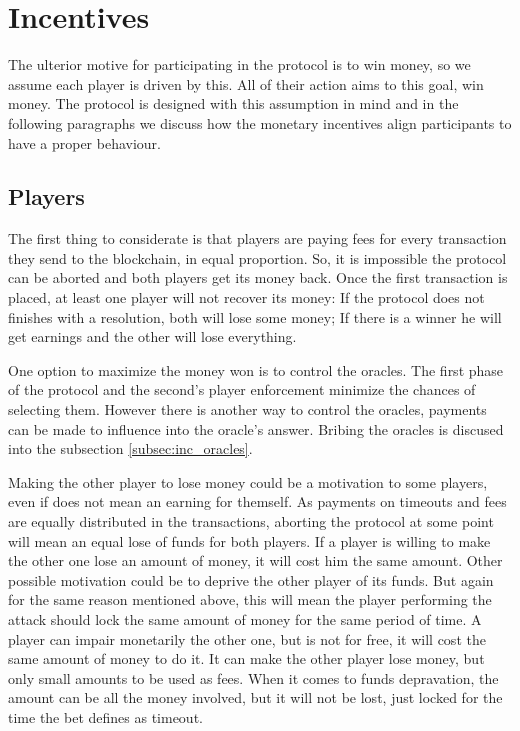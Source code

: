 \section{Incentives}

The ulterior motive for participating in the protocol is to win money, so we
  assume each player is driven by this.
All of their action aims to this goal, win money. The protocol is designed with
  this assumption in mind and in the following paragraphs we discuss how the
  monetary incentives align participants to have a proper behaviour.

\subsection{Players}
The first thing to considerate is that players are paying fees for every
  transaction they send to the blockchain, in equal proportion.
So, it is impossible the protocol can be aborted and both players get its
  money back.
Once the first transaction is placed, at least one player will not recover its
  money: If the protocol does not finishes with a resolution, both will lose
  some money; If there is a winner he will get earnings and the other will lose
  everything.

One option to maximize the money won is to control the oracles.
The first phase of the protocol and the second's player enforcement
  minimize the chances of selecting them.
However there is another way to control the oracles, payments can be made to
  influence into the oracle's answer.
Bribing the oracles is discused into the subsection \ref{subsec:inc_oracles}.

Making the other player to lose money could be a motivation to some players,
  even if does not mean an earning for themself.
As payments on timeouts and fees are equally distributed in the transactions,
  aborting the protocol at some point will mean an equal lose of funds for both
  players. If a player is willing to make the other one lose an amount of money,
  it will cost him the same amount.
Other possible motivation could be to deprive the other player of its funds.
But again for the same reason mentioned above, this will mean the player
  performing the attack should lock the same amount of money for the same period
  of time.
A player can impair monetarily the other one, but is not for free, it will cost
  the same amount of money to do it. It can make the other player lose money,
  but only small amounts to be used as fees.
When it comes to funds depravation, the amount can be all the money involved,
  but it will not be lost, just locked for the time the bet defines as timeout.

